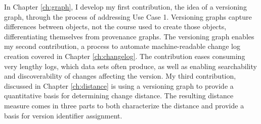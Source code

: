 
In Chapter \ref{ch:graph}, I develop my first contribution, the idea of a versioning graph, through the process of addressing Use Case 1.
Versioning graphs capture differences between objects, not the course used to create those objects, differentiating themselves from provenance graphs.
The versioning graph enables my second contribution, a process to automate machine-readable change log creation covered in Chapter \ref{ch:changelog}.
The contribution eases consuming very lengthy logs, which data sets often produce, as well as enabling searchability and discoverability of changes affecting the version.
My third contribution, discussed in Chapter \ref{ch:distance} is using a versioning graph to provide a quantitative basis for determining change distance.
The resulting distance measure comes in three parts to both characterize the distance and provide a basis for version identifier assignment.

